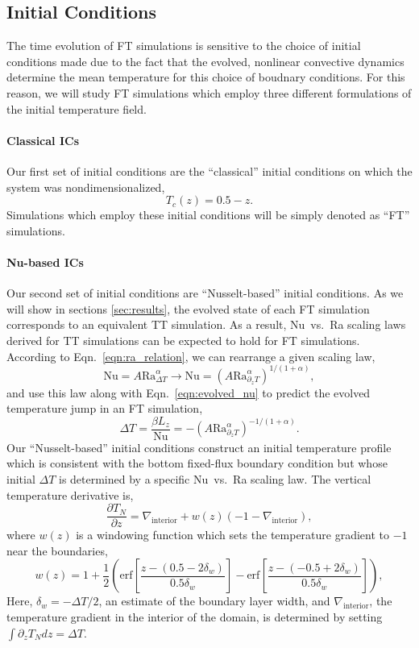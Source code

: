 \documentclass[aps, pre, onecolumn, nofootinbib, notitlepage, groupedaddress, amsfonts, amssymb, amsmath, longbibliography, superscriptaddress]{revtex4-1}
\newcommand{\grad}{\ensuremath{\nabla}}
\newcommand{\ea}[1]{{\color{red} #1}}
\begin{document}
\ea{
\subsection{Initial Conditions}
The time evolution of FT simulations is sensitive to the choice of initial conditions made due to the fact that the evolved, nonlinear convective dynamics determine the mean temperature for this choice of boudnary conditions.
For this reason, we will study FT simulations which employ three different formulations of the initial temperature field.

\paragraph{Classical ICs} 
Our first set of initial conditions are the ``classical'' initial conditions on which the system was nondimensionalized,
\begin{equation}
T_c(z) = 0.5 - z.
\end{equation}
Simulations which employ these initial conditions will be simply denoted as ``FT'' simulations.

\paragraph{Nu-based ICs} 
Our second set of initial conditions are ``Nusselt-based'' initial conditions.
As we will show in sections \ref{sec:results}, the evolved state of each FT simulation corresponds to an equivalent TT simulation.
As a result, Nu~vs.~Ra scaling laws derived for TT simulations can be expected to hold for FT simulations.
According to Eqn.~\ref{eqn:ra_relation}, we can rearrange a given scaling law,
\begin{equation}
\text{Nu} = A \text{Ra}_{\Delta T}^{\alpha} \rightarrow \text{Nu} = (A \text{Ra}_{\partial_z T}^{\alpha})^{1/(1+\alpha)},
\end{equation}
and use this law along with Eqn.~\ref{eqn:evolved_nu} to predict the evolved temperature jump in an FT simulation,
\begin{equation}
\Delta T = \frac{\beta L_z}{\text{Nu}} = -(A \text{Ra}_{\partial_z T}^{\alpha})^{-1/(1+\alpha)}.
\end{equation}
Our ``Nusselt-based'' initial conditions construct an initial temperature profile which is consistent with the bottom fixed-flux boundary condition but whose initial $\Delta T$ is determined by a specific Nu~vs.~Ra scaling law.
The vertical temperature derivative is,
\begin{equation}
\frac{\partial T_N}{\partial z} = \grad_{\text{interior}} + w(z)(-1 - \grad_{\text{interior}}),
\end{equation}
where $w(z)$ is a windowing function which sets the temperature gradient to $-1$ near the boundaries,
$$
w(z) = 1 + \frac{1}{2}\left(\text{erf}\left[\frac{z - (0.5 - 2\delta_w)}{0.5\delta_w}\right] - \text{erf}\left[\frac{z - (-0.5 + 2\delta_w)}{0.5\delta_w}\right]\right),
$$
Here, $\delta_w = -\Delta T / 2$, an estimate of the boundary layer width, and $\grad_{\text{interior}}$, the temperature gradient in the interior of the domain, is determined by setting $\int \partial_z T_N dz = \Delta T$.

}
\end{document}
